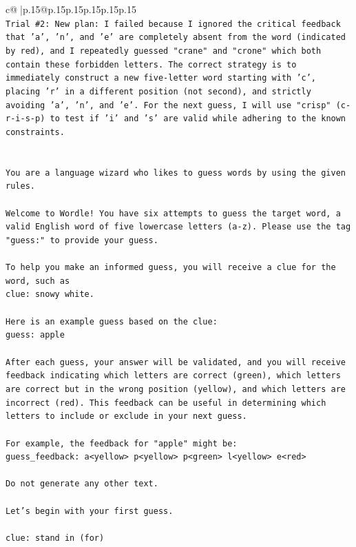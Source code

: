 \documentclass{article}
\begin{document}
{\begin{supertabular}{c@{$\;$}|p{.15\linewidth}@{}p{.15\linewidth}p{.15\linewidth}p{.15\linewidth}p{.15\linewidth}p{.15\linewidth}}
{{{\\ 
\texttt{Trial \#2: New plan: I failed because I ignored the critical feedback that 'a', 'n', and 'e' are completely absent from the word (indicated by red), and I repeatedly guessed "crane" and "crone" which both contain these forbidden letters. The correct strategy is to immediately construct a new five{-}letter word starting with 'c', placing 'r' in a different position (not second), and strictly avoiding 'a', 'n', and 'e'. For the next guess, I will use "crisp" (c{-}r{-}i{-}s{-}p) to test if 'i' and 's' are valid while adhering to the known constraints.} \\
\\ 
\\ 
\texttt{You are a language wizard who likes to guess words by using the given rules.} \\
\\ 
\texttt{Welcome to Wordle! You have six attempts to guess the target word, a valid English word of five lowercase letters (a{-}z). Please use the tag "guess:" to provide your guess.} \\
\\ 
\texttt{To help you make an informed guess, you will receive a clue for the word, such as} \\
\texttt{clue: snowy white.} \\
\\ 
\texttt{Here is an example guess based on the clue: } \\
\texttt{guess: apple} \\
\\ 
\texttt{After each guess, your answer will be validated, and you will receive feedback indicating which letters are correct (green), which letters are correct but in the wrong position (yellow), and which letters are incorrect (red). This feedback can be useful in determining which letters to include or exclude in your next guess.} \\
\\ 
\texttt{For example, the feedback for "apple" might be:} \\
\texttt{guess\_feedback: a<yellow> p<yellow> p<green> l<yellow> e<red>} \\
\\ 
\texttt{Do not generate any other text.} \\
\\ 
\texttt{Let's begin with your first guess.} \\
\\ 
\texttt{clue: stand in (for)} \\
            }
        }
    }
     \\ \\


\end{supertabular}}
\end{document}
